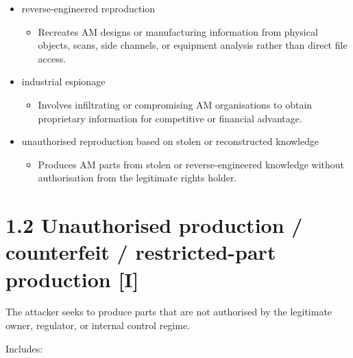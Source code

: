 \documentclass[10pt,a4paper,oneside]{report}
\begin{document}
\begin{itemize}
\begin{itemize}
\end{itemize}
\item reverse-engineered reproduction
\begin{itemize}
\item Recreates AM designs or manufacturing information from physical objects, scans, side channels, or equipment analysis rather than direct file access.
\end{itemize}
\item industrial espionage
\begin{itemize}
\item Involves infiltrating or compromising AM organisations to obtain proprietary information for competitive or financial advantage.
\end{itemize}
\item unauthorised reproduction based on stolen or reconstructed knowledge
\begin{itemize}
\item Produces AM parts from stolen or reverse-engineered knowledge without authorisation from the legitimate rights holder.
\end{itemize}
\end{itemize}


\section{1.2 Unauthorised production / counterfeit / restricted-part production [I]}


The attacker seeks to produce parts that are not authorised by the legitimate owner, regulator, or internal control regime.

Includes:
\end{document}
